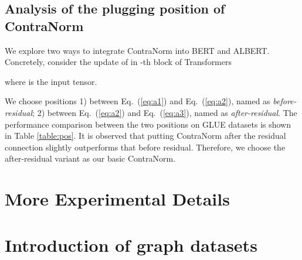 \documentclass{article}
\theoremstyle{definition}
\theoremstyle{remark}
\theoremstyle{theorem}
\begin{document}
\subsection{Analysis of the plugging position of ContraNorm} \label{appen:pos}
We explore two ways to integrate ContraNorm into BERT and ALBERT. Concretely, consider the update of  in -th block of Transformers 

where  is the input tensor.

We choose positions 1) between Eq.~(\ref{eq:a1}) and Eq.~(\ref{eq:a2}), named as \textit{before-residual}; 2) between Eq.~(\ref{eq:a2}) and Eq.~(\ref{eq:a3}), named as \textit{after-residual}. The performance comparison between the two positions on GLUE datasets is shown in Table \ref{table:pos}. It is observed that putting ContraNorm after the residual connection slightly outperforms that before residual. Therefore, we choose the after-residual variant as our basic ContraNorm.

\begin{table}[h]
	\centering
	\caption{Results comparison on different plugging positions of ContraNorm. Experiments are evaluated on the validation set of GLUE tasks. \textbf{Avg} denotes the average performance on all the tasks. The best result for each task is bolded.} 
	\label{table:pos}
\end{table}


\section{More Experimental Details}

\section{Introduction of graph datasets} \label{appen:data}
\end{document}

